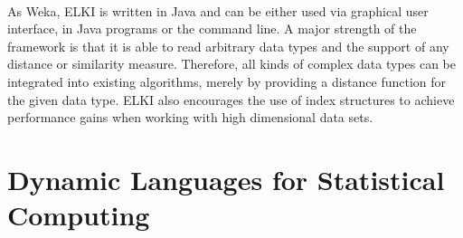 \\
As Weka, ELKI is written in Java and can be either used via graphical user interface, in Java programs or the command line. A major strength of the framework is that it is able to read arbitrary data types and the support of any distance or similarity measure. Therefore, all kinds of complex data types can be integrated into existing algorithms, merely by providing a distance function for the given data type. ELKI also encourages the use of index structures to achieve performance gains when working with high dimensional data sets. 


\section{Dynamic Languages for Statistical Computing}

